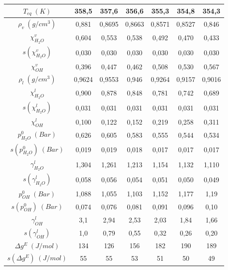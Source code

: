 \documentclass[a4paper,12pt,titlepage]{article}
\begin{document}
\begin{table}[h!]
\centering
\begin{tabular}{|c|c|c|c|c|c|c|}
\hline
$T_{eq}\; (K)$               & 358,5  & 357,6  & 356,6  & 355,3  & 354,8  & 354,3  \\ \hline
$\rho_v\; (g/cm^3)$          & 0,881  & 0,8695 & 0,8663 & 0,8571 & 0,8527 & 0,846  \\ \hline
$\chi_{H_2O}^v$             & 0,604  & 0,553  & 0,538  & 0,492  & 0,470  & 0,433  \\ \hline
$s(\chi_{H_2O}^v)$          & 0,030  & 0,030  & 0,030  & 0,030  & 0,030  & 0,030  \\ \hline
$\chi_{OH}^v$               & 0,396  & 0,447  & 0,462  & 0,508  & 0,530  & 0,567  \\ \hline
$\rho_l\; (g/cm^3)$          & 0,9624 & 0,9553 & 0,946  & 0,9264 & 0,9157 & 0,9016 \\ \hline
$\chi_{H_2O}^l$             & 0,900  & 0,878  & 0,848  & 0,781  & 0,742  & 0,689  \\ \hline
$s(\chi_{H_2O}^l)$          & 0,031  & 0,031  & 0,031  & 0,031  & 0,031  & 0,031  \\ \hline
$\chi_{OH}^l$               & 0,100  & 0,122  & 0,152  & 0,219  & 0,258  & 0,311  \\ \hline
$p_{H_2O}^0 \;(Bar)$         & 0,626  & 0,605  & 0,583  & 0,555  & 0,544  & 0,534  \\ \hline
$s(p_{H_2O}^0) \;(Bar)$      & 0,019  & 0,019  & 0,018  & 0,017  & 0,017  & 0,017  \\ \hline
$\gamma_{H_2O}^l$            & 1,304  & 1,261  & 1,213  & 1,154  & 1,132  & 1,110  \\ \hline
$s(\gamma_{H_2O}^l)$         & 0,058  & 0,056  & 0,054  & 0,051  & 0,050  & 0,049  \\ \hline
$p_{OH}^0 \;(Bar)$           & 1,088  & 1,055  & 1,103  & 1,152  & 1,177  & 1,19   \\ \hline
$s(p_{OH}^0) \;(Bar)$        & 0,074  & 0,076  & 0,081  & 0,091  & 0,096  & 0,10   \\ \hline
$\gamma_{OH}^l$              & 3,1    & 2,94   & 2,53   & 2,03   & 1,84   & 1,66   \\ \hline
$s(\gamma_{OH}^l)$           & 1,0    & 0,79   & 0,55   & 0,32   & 0,26   & 0,20   \\ \hline
$\Delta g^{E} \; (J/mol)$    & 134    & 126    & 156    & 182    & 190    & 189    \\ \hline
$s(\Delta g^{E}) \; (J/mol)$ & 55     & 55     & 53     & 51     & 50     & 49     \\ \hline

\end{tabular}
\end{table}
\end{document}
